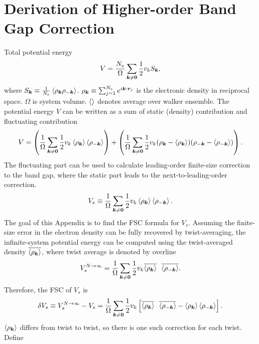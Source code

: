 \chapter{Derivation of Higher-order Band Gap Correction}

Total potential energy
\begin{align}
V = \frac{N_e}{\Omega}\sum_{\boldsymbol{k}\neq\boldsymbol{0}} \frac{1}{2} v_k S_{\boldsymbol{k}},
\end{align}
where $S_{\boldsymbol{k}}\equiv\frac{1}{N_e}\braket{\rho_{\boldsymbol{k}}\rho_{-\boldsymbol{k}}}$. $\rho_{\boldsymbol{k}}\equiv \sum_{j=1}^{N_e} e^{i\boldsymbol{k}\cdot\boldsymbol{r}_j}$ is the electronic density in reciprocal space. $\Omega$ is system volume. $\braket{}$ denotes average over walker ensemble. The potential energy $V$ can be written as a sum of static (density) contribution and fluctuating contribution
\begin{align}
V = \left(
\frac{1}{\Omega} \sum_{\boldsymbol{k}\neq\boldsymbol{0}}
\frac{1}{2} v_k \braket{\rho_{\boldsymbol{k}}}\braket{\rho_{-\boldsymbol{k}}}
\right) +
\left(
\frac{1}{\Omega}\sum_{\boldsymbol{k}\neq\boldsymbol{0}}
\frac{1}{2} v_k  (\rho_{\boldsymbol{k}}-\braket{\rho_{\boldsymbol{k}}}) (\rho_{-\boldsymbol{k}}-\braket{\rho_{-\boldsymbol{k}}})
\right).
\end{align}
The fluctuating part can be used to calculate leading-order finite-size correction to the band gap, where the static part leads to the next-to-leading-order correction.
\begin{align}
V_s \equiv \frac{1}{\Omega}\sum_{\boldsymbol{k}\neq\boldsymbol{0}} \frac{1}{2} v_k \braket{\rho_{\boldsymbol{k}}}\braket{\rho_{-\boldsymbol{k}}}.
\end{align}
The goal of this Appendix is to find the FSC formula for $V_s$. Assuming the finite-size error in the electron density can be fully recovered by twist-averaging, the infinite-system potential energy can be computed using the twist-averaged density $\overline{\braket{\rho_{\boldsymbol{k}}}}$, where twist average is denoted by overline
\begin{align}
V_s^{N\rightarrow\infty} = \frac{1}{\Omega}\sum_{\bs{k}\neq\bs{0}} \frac{1}{2} v_k \overline{\braket{\rho_{\bs{k}}}} \ \ \overline{\braket{\rho_{-\bs{k}}}}. \label{eq:vsinf}
\end{align}
Therefore, the FSC of $V_s$ is
\begin{align}
\delta V_s \equiv V_s^{N\rightarrow\infty} - V_s = \frac{1}{\Omega}\sum_{\boldsymbol{k}\neq\boldsymbol{0}} \frac{1}{2} v_k \left[ \overline{\braket{\rho_{\boldsymbol{k}}}} \ \ \overline{\braket{\rho_{-\boldsymbol{k}}}} -
\braket{\rho_{\boldsymbol{k}}}\braket{\rho_{-\boldsymbol{k}}}
\right].
\end{align}
$\braket{\rho_{\boldsymbol{k}}}$ differs from twist to twist, so there is one such correction for each twist. Define

